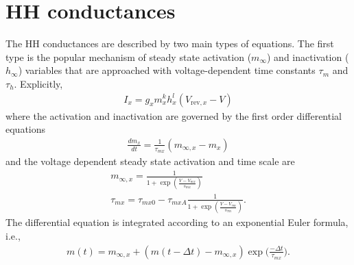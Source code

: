 \documentclass{article}
\begin{document}
\section{HH conductances}

The HH conductances are described by two main types of equations. The
first type is the popular mechanism of steady state activation
($m_\infty$) and inactivation ($h_\infty$) variables that are
approached with voltage-dependent time constants $\tau_m$ and
$\tau_h$.
Explicitly,
\begin{align}
I_{x}= g_{x} m_x^k h_x^l (V_{\text{rev},x}-V) 
\end{align}
where the activation and inactivation are governed by the first order
differential equations
\begin{align}
\frac{dm_x}{dt}= \frac{1}{\tau_{mx}} (m_{\infty,x} - m_x)
\end{align}
and the voltage dependent steady state activation and time scale are
\begin{align}
m_{\infty,x}= \frac{1}{1+\exp(\frac{V-V_{mx}}{s_{mx}})} \\
\tau_{mx}= \tau_{mx0} - \tau_{mxA} \frac{1}{1+\exp(\frac{V-V_{\tau
      m}}{s_{\tau m}})}.
\end{align}
The differential equation is integrated according to an exponential
Euler formula, i.e.,
\begin{align}
m(t)= m_{\infty,x} + (m(t-\Delta t)-m_{\infty,x})\exp\Big(\frac{-\Delta t}{\tau_{mx}}\Big) .
\end{align}
 
\end{document}
